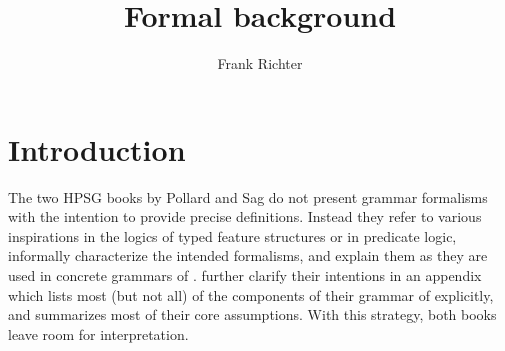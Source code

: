 \documentclass[output=paper
 	        ,biblatex
                ,babelshorthands
                ,newtxmath
                ,draftmode
                ,colorlinks, citecolor=brown
]{langscibook}
\author{%
 Frank Richter\affiliation{Goethe Universität Frankfurt}%
}
\title{Formal background}
\begin{document}
\maketitle
\label{chap-formal-background}

\section{Introduction}
\label{sec-introduction}

The two HPSG books by Pollard and Sag
\citep{PollardSag1987,PollardSag1994} do not present grammar formalisms
with the intention to provide precise definitions.
Instead they refer to various inspirations in the
logics of typed feature structures or in predicate logic, informally
characterize the intended formalisms, and explain them as they are
used in concrete grammars of . \citet{PollardSag1994} further clarify
their intentions in an appendix which lists most (but not all) of the components
of their grammar of  explicitly, and summarizes most of their core
assumptions. With this strategy, both books leave room for
interpretation.
\end{document}

